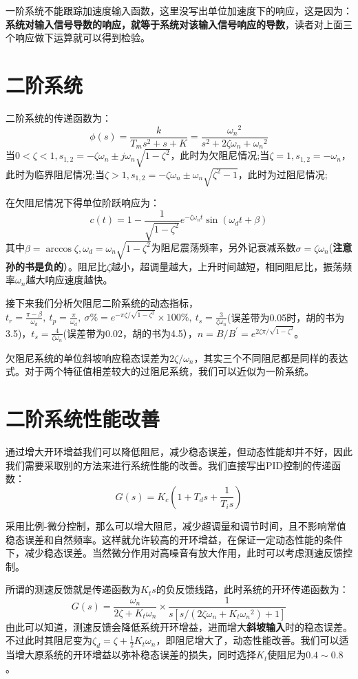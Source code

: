 \documentclass[lang=cn,10pt]{elegantbook}
\begin{document}
一阶系统不能跟踪加速度输入函数，这里没写出单位加速度下的响应，这是因为：\textbf{系统对输入信号导数的响应，就等于系统对该输入信号响应的导数}，读者对上面三个响应做下运算就可以得到检验。

\section{二阶系统}
二阶系统的传递函数为：
\[\phi(s)=\frac{k}{T_ms^2+s+K}=\frac{{\omega_n}^2}{s^2+2\zeta \omega_n +{\omega_n}^2}\]
当$0<\zeta<1,s_{1,2}=-\zeta \omega_n \pm j\omega_n \sqrt{1-{\zeta}^2}$，此时为欠阻尼情况;当$\zeta=1,s_{1,2}=-\omega_n$，此时为临界阻尼情况;当$\zeta>1,s_{1,2}=-\zeta \omega_n \pm \omega_n \sqrt{{\zeta}^2-1}$，此时为过阻尼情况;

在欠阻尼情况下得单位阶跃响应为：
\[c(t)=1-\frac{1}{\sqrt{1-{\zeta}^2}}e^{-\zeta \omega_n t} \sin{(\omega_d t+\beta)}\]
其中$\beta=\arccos{\zeta},\omega_d=\omega_n\sqrt{1-{\zeta}^2}$为阻尼震荡频率，另外记衰减系数$\sigma=\zeta \omega_n$(\textbf{注意孙的书是负的}）。阻尼比$\zeta$越小，超调量越大，上升时间越短，相同阻尼比，振荡频率$\omega_n$越大响应速度越快。

接下来我们分析欠阻尼二阶系统的动态指标，$t_r=\frac{\pi-\beta}{\omega_d},~t_p=\frac{\pi}{\omega_d}, ~ \sigma \%=e^{-\pi \zeta/\sqrt{1-{\zeta}^2}}\times 100\%,~ t_s=\frac{3}{\zeta \omega_n}$(误差带为0.05时，胡的书为3.5)，$t_s=\frac{4}{\zeta \omega_n}$(误差带为0.02，胡的书为4.5），$n=B/B^{\prime}=e^{2\zeta \pi/\sqrt{1-{\zeta}^2}}$。

欠阻尼系统的单位斜坡响应稳态误差为$2\zeta/\omega_n$，其实三个不同阻尼都是同样的表达式。对于两个特征值相差较大的过阻尼系统，我们可以近似为一阶系统。

\section{二阶系统性能改善}
通过增大开环增益我们可以降低阻尼，减少稳态误差，但动态性能却并不好，因此我们需要采取别的方法来进行系统性能的改善。我们直接写出PID控制的传递函数：
\[G(s)=K_c(1+T_d s+\frac{1}{T_i s})\]

采用比例-微分控制，那么可以增大阻尼，减少超调量和调节时间，且不影响常值稳态误差和自然频率。这样就允许较高的开环增益，在保证一定动态性能的条件下，减少稳态误差。当然微分作用对高噪音有放大作用，此时可以考虑测速反馈控制。

所谓的测速反馈就是传递函数为$K_t s$的负反馈线路，此时系统的开环传递函数为：
\[G(s)=\frac{\omega_n}{2\zeta+K_t \omega_n } \times \frac{1 }{s[s/(2\zeta \omega_n+K_t {\omega_n}^2 )+1] }\]
由此可以知道，测速反馈会降低系统开环增益，进而增大\textbf{斜坡输入}时的稳态误差。不过此时其阻尼变为$\zeta_d=\zeta +\frac{1}{2}K_t \omega_n$，即阻尼增大了，动态性能改善。我们可以适当增大原系统的开环增益以弥补稳态误差的损失，同时选择$K_t$使阻尼为$0.4\sim 0.8$。
\end{document}
